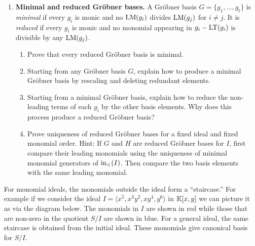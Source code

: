 \documentclass[12pt,reqno]{amsart}
\begin{document}
\begin{enumerate}[leftmargin=*, series=problems]
\begin{enumerate}[label=(\alph*),ref=\theenumi\alph*]
    \item Prove that if $G$ is a Gr\"obner basis for $I$, then the remainder of $f$ on division by $G$ is independent of all choices made during the division algorithm. Hint: If two remainders $r$ and $r'$ occur, compare $r-r'$.
    
    \item Let $I=\langle xy-1,y^2-1\rangle\subset\KK[x,y]$ with lex order $x>y$. Divide $x-y$ by the ordered list $(xy-1,y^2-1)$. Explain why the answer is consistent with part (b).
\end{enumerate}

\item \textbf{Minimal and reduced Gr\"obner bases.} A Gr\"obner basis $G=\{g_1,\ldots,g_t\}$ is \emph{minimal} if every $g_i$ is monic and no $\operatorname{LM}(g_i)$ divides $\operatorname{LM}(g_j)$ for $i\neq j$. It is \emph{reduced} if every $g_i$ is monic and no monomial appearing in $g_i-\operatorname{LT}(g_i)$ is divisible by any $\operatorname{LM}(g_j)$.
\begin{enumerate}[label=(\alph*),ref=\theenumi\alph*]
    \item Prove that every reduced Gr\"obner basis is minimal.
    
    \item Starting from any Gr\"obner basis $G$, explain how to produce a minimal Gr\"obner basis by rescaling and deleting redundant elements.
    
    \item Starting from a minimal Gr\"obner basis, explain how to reduce the non-leading terms of each $g_i$ by the other basis elements. Why does this process produce a reduced Gr\"obner basis?
    
    \item Prove uniqueness of reduced Gr\"obner bases for a fixed ideal and fixed monomial order. Hint: If $G$ and $H$ are reduced Gr\"obner bases for $I$, first compare their leading monomials using the uniqueness of minimal monomial generators of $\operatorname{in}_<(I)$. Then compare the two basis elements with the same leading monomial.
\end{enumerate}

\end{enumerate}

\hrulefill

For monomial ideals, the monomials outside the ideal form a ``staircase.'' For example if we consider the ideal $I=\langle x^5, x^{3}y^{2}, xy^{4}, y^{6}\rangle$ in $\mathbb{K}[x,y]$ we can picture it as via the diagram below. The monomials in $I$ are shown in red while those that are non-zero in the quotient $S/I$ are shown in blue.
For a general ideal, the same staircase is obtained from the initial ideal. These monomials give canonical basis for $S/I$.
\end{document}
